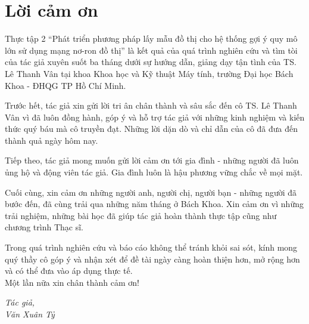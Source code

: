 \chapter*{Lời cảm ơn}
Thực tập 2 ``Phát triển phương pháp lấy mẫu đồ thị cho hệ thống gợi ý quy mô lớn sử dụng mạng nơ-ron đồ thị'' là kết quả của quá trình nghiên cứu và tìm tòi của tác giả xuyên suốt ba tháng dưới sự hướng dẫn, giảng dạy tận tình của TS. Lê Thanh Vân tại khoa Khoa học và Kỹ thuật Máy tính, trường Đại học Bách Khoa - ĐHQG TP Hồ Chí Minh. 

Trước hết, tác giả xin gửi lời tri ân chân thành và sâu sắc đến cô TS. Lê Thanh Vân vì đã luôn đồng hành, góp ý và hỗ trợ tác giả với những kinh nghiệm và kiến thức quý báu mà cô truyền đạt. Những lời dặn dò và chỉ dẫn của cô đã đưa đến thành quả ngày hôm nay. 

Tiếp theo, tác giả mong muốn gửi lời cảm ơn tới gia đình - những người đã luôn ủng hộ và động viên tác giả. Gia đình luôn là hậu phương vững chắc về mọi mặt. 

Cuối cùng, xin cảm ơn những người anh, người chị, người bạn - những người đã bước đến, đã cùng trải qua những năm tháng ở Bách Khoa. Xin cảm ơn vì những trải nghiệm, những bài học đã giúp tác giả hoàn thành thực tập cũng như chương trình Thạc sĩ.

Trong quá trình nghiên cứu và báo cáo không thể tránh khỏi sai sót, kính mong quý thầy cô góp ý và nhận xét để đề tài ngày càng hoàn thiện hơn, mở rộng hơn và có thể đưa vào áp dụng thực tế.\\

Một lần nữa xin chân thành cảm ơn!\\

\begin{flushright}
\textit{
Tác giả,\\
Văn Xuân Tỷ
}
\end{flushright}
